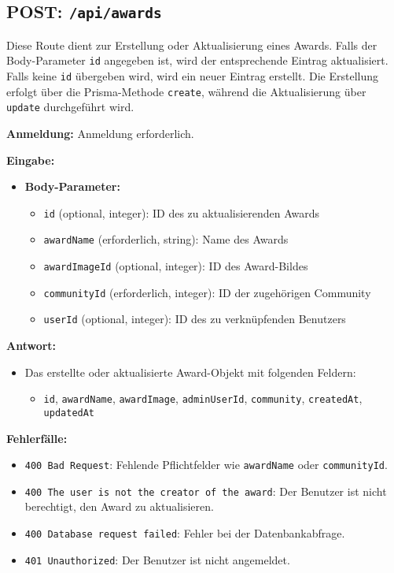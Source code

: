 \documentclass[a4paper,12pt]{article}
\begin{document}
\subsection{POST: \texttt{/api/awards}}

Diese Route dient zur Erstellung oder Aktualisierung eines Awards. Falls der
Body-Parameter \texttt{id} angegeben ist, wird der entsprechende Eintrag
aktualisiert. Falls keine \texttt{id} übergeben wird, wird ein neuer Eintrag
erstellt. Die Erstellung erfolgt über die Prisma-Methode \texttt{create},
während die Aktualisierung über \texttt{update} durchgeführt wird.

\textbf{Anmeldung:} Anmeldung erforderlich.

\textbf{Eingabe:}
\begin{itemize}
    \item \textbf{Body-Parameter:}
    \begin{itemize}
        \item \texttt{id} (optional, integer):
            ID des zu aktualisierenden Awards
        \item \texttt{awardName} (erforderlich, string):
            Name des Awards
        \item \texttt{awardImageId} (optional, integer):
            ID des Award-Bildes
        \item \texttt{communityId} (erforderlich, integer):
            ID der zugehörigen Community
        \item \texttt{userId} (optional, integer):
            ID des zu verknüpfenden Benutzers
    \end{itemize}
\end{itemize}

\textbf{Antwort:}
\begin{itemize}
    \item Das erstellte oder aktualisierte Award-Objekt mit folgenden Feldern:
    \begin{itemize}
        \item \texttt{id},
              \texttt{awardName},
              \texttt{awardImage},
              \texttt{adminUserId},
              \texttt{community},
              \texttt{createdAt},
              \texttt{updatedAt}
    \end{itemize}
\end{itemize}

\textbf{Fehlerfälle:}
\begin{itemize}
    \item \texttt{400 Bad Request}:
        Fehlende Pflichtfelder wie \texttt{awardName} oder
        \texttt{communityId}.
    \item \texttt{400 The user is not the creator of the award}:
        Der Benutzer ist nicht berechtigt, den Award zu aktualisieren.
    \item \texttt{400 Database request failed}:
        Fehler bei der Datenbankabfrage.
    \item \texttt{401 Unauthorized}:
        Der Benutzer ist nicht angemeldet.
\end{itemize}
\end{document}
